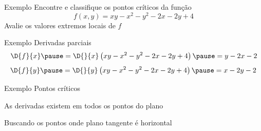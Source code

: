 \addtocounter{exemplo}{1}
\begin{frame}{Exemplo \theexemplo}
  Encontre e classifique os pontos críticos da função
  \[
    f(x, y) = xy -x^2 - y^2 -2x -2y +4
  \]
  Avalie os valores extremos locais de $f$
\end{frame}

\begin{frame}{Exemplo \theexemplo}
  Derivadas parciais
  \pause
  \vspace{\baselineskip}
  \[
    \D{f}{x}
    \pause
    = \D{}{x}\left(xy -x^2 - y^2 -2x -2y +4\right)
    \pause
    = y -2x -2
  \]
  \pause
  \vspace{\baselineskip}
  \[
    \D{f}{y}
    \pause
    = \D{}{y}\left(xy -x^2 - y^2 -2x -2y +4\right)
    \pause
    = x -2y -2
  \]
\end{frame}

\begin{frame}{Exemplo \theexemplo}
  Pontos críticos

  \pause
  \vspace{\baselineskip}
  As derivadas existem em todos os pontos do plano

  \pause
  \vspace{\baselineskip}
  Buscando os pontos onde plano tangente é horizontal
\end{frame}

